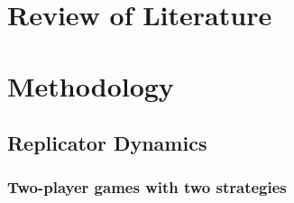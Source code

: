 \documentclass{article}
\begin{document}
\section{Review of Literature}
\section{Methodology}
\subsection{Replicator Dynamics}
\label{subsec:Replicator Dynamics}
\subsubsection{Two-player games with two strategies}
\label{subsubsec:Two-player games with two strategies}
\end{document}
